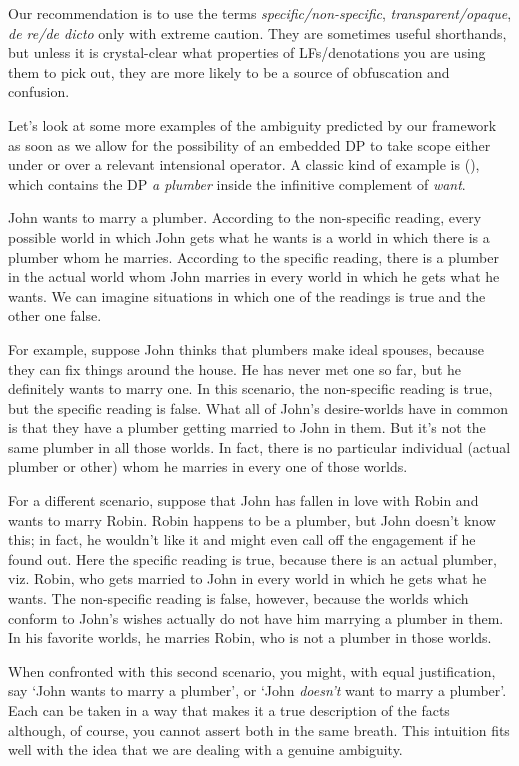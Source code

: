 Our recommendation is to use the terms \emph{specific/non-specific},
\emph{transparent/opaque}, \emph{de re/de dicto} only with extreme caution. They
are sometimes useful shorthands, but unless it is crystal-clear what properties
of LFs/denotations you are using them to pick out, they are more likely to be a
source of obfuscation and confusion.

Let's look at some more examples of the ambiguity predicted by our framework as
soon as we allow for the possibility of an embedded DP to take scope either
under or over a relevant intensional operator. A classic kind of example is
(\nextx), which contains the DP \emph{a plumber} inside the infinitive
complement of \emph{want}.

\ex John wants to marry a plumber. \xe
%
According to the non-specific reading, every possible world in which John gets
what he wants is a world in which there is a plumber whom he marries. According
to the specific reading, there is a plumber in the actual world whom John
marries in every world in which he gets what he wants. We can imagine situations
in which one of the readings is true and the other one false.

For example, suppose John thinks that plumbers make ideal spouses, because they
can fix things around the house. He has never met one so far, but he definitely
wants to marry one. In this scenario, the non-specific reading is true, but the
specific reading is false. What all of John's desire-worlds have in common is
that they have a plumber getting married to John in them. But it's not the same
plumber in all those worlds. In fact, there is no particular individual (actual
plumber or other) whom he marries in every one of those worlds.

For a different scenario, suppose that John has fallen in love with Robin and
wants to marry Robin. Robin happens to be a plumber, but John doesn't know this;
in fact, he wouldn't like it and might even call off the engagement if he found
out. Here the specific reading is true, because there is an actual plumber, viz.
Robin, who gets married to John in every world in which he gets what he wants.
The non-specific reading is false, however, because the worlds which conform to
John's wishes actually do not have him marrying a plumber in them. In his
favorite worlds, he marries Robin, who is not a plumber in those worlds.

When confronted with this second scenario, you might, with equal justification,
say `John wants to marry a plumber', or `John \emph{doesn't} want to marry a
plumber'. Each can be taken in a way that makes it a true description of the
facts \dash although, of course, you cannot assert both in the same
breath. This intuition
fits well with the idea that we are dealing with a genuine ambiguity.

